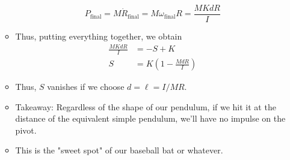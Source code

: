 \documentclass[../notes.tex]{subfiles}
\begin{document}
\begin{itemize}
\begin{itemize}
        \begin{equation*}
            P_\text{final} = M\dot{R}_\text{final}
            = M\omega_\text{final}R
            = \frac{MKdR}{I}
        \end{equation*}
        \item Thus, putting everything together, we obtain
        \begin{align*}
            \frac{MKdR}{I} &= -S+K\\
            S &= K\left( 1-\frac{MdR}{I} \right)
        \end{align*}
        \item Thus, $S$ vanishes if we choose $d=\ell=I/MR$.
        \item Takeaway: Regardless of the shape of our pendulum, if we hit it at the distance of the equivalent simple pendulum, we'll have no impulse on the pivot.
        \item This is the "sweet spot" of our baseball bat or whatever.
    \end{itemize}
\end{itemize}
\end{document}
